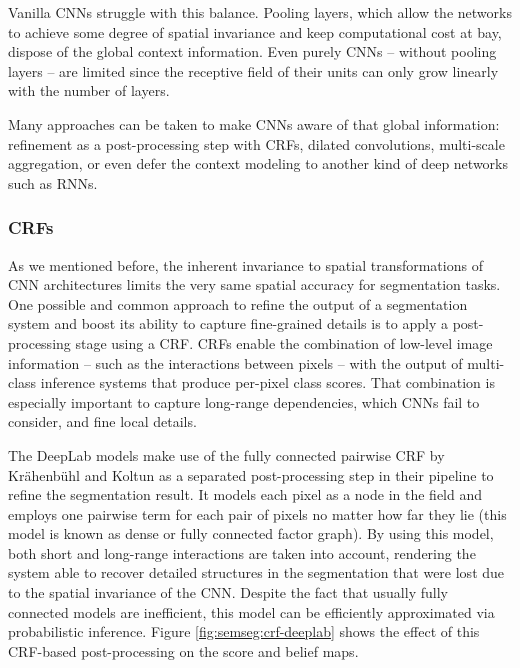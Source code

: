 Vanilla \acp{CNN} struggle with this balance. Pooling layers, which allow the networks to achieve some degree of spatial invariance and keep computational cost at bay, dispose of the global context information. Even purely \acp{CNN} -- without pooling layers -- are limited since the receptive field of their units can only grow linearly with the number of layers.

Many approaches can be taken to make \acp{CNN} aware of that global information: refinement as a post-processing step with \acp{CRF}, dilated convolutions, multi-scale aggregation, or even defer the context modeling to another kind of deep networks such as \acp{RNN}.

\subsubsection{\aclp{CRF}}

As we mentioned before, the inherent invariance to spatial transformations of \ac{CNN} architectures limits the very same spatial accuracy for segmentation tasks. One possible and common approach to refine the output of a segmentation system and boost its ability to capture fine-grained details is to apply a post-processing stage using a \acf{CRF}. \acp{CRF} enable the combination of low-level image information -- such as the interactions between pixels \cite{Rother2004}\cite{Shotton2009} -- with the output of multi-class inference systems that produce per-pixel class scores. That combination is especially important to capture long-range dependencies, which \acp{CNN} fail to consider, and fine local details.

The DeepLab models \cite{Chen2014a}\cite{Chen2016} make use of the fully connected pairwise \ac{CRF} by Krähenbühl and Koltun\cite{Koltun2011}\cite{Kraehenbuehl2013} as a separated post-processing step in their pipeline to refine the segmentation result. It models each pixel as a node in the field and employs one pairwise term for each pair of pixels no matter how far they lie (this model is known as dense or fully connected factor graph). By using this model, both short and long-range interactions are taken into account, rendering the system able to recover detailed structures in the segmentation that were lost due to the spatial invariance of the \ac{CNN}. Despite the fact that usually fully connected models are inefficient, this model can be efficiently approximated via probabilistic inference. Figure \ref{fig:semseg:crf-deeplab} shows the effect of this \ac{CRF}-based post-processing on the score and belief maps.

